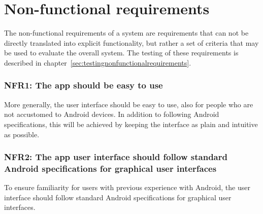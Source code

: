 \section{Non-functional requirements}
\label{sec:nonFunctionalReq}
The non-functional requirements of a system are requirements that can not be directly translated into explicit functionality, but rather a set of criteria that may be used to evaluate the overall system. The testing of these requirements is described in chapter~\ref{sec:testingnonfunctionalrequirements}.

\subsubsection{NFR1: The app should be easy to use}
More generally, the user interface should be easy to use, also for people who are not accustomed to Android devices. In addition to following Android specifications, this will be achieved by keeping the interface as plain and intuitive as possible. 

\subsubsection{NFR2: The app user interface should follow standard Android specifications for graphical user interfaces}
To ensure familiarity for users with previous experience with Android, the user interface should follow standard Android specifications for graphical user interfaces.
 
\begin{comment}

\subsubsection{NFR2: Installation guide and documentation}
The system should come with a comprehensive guide to using the system. This should include documentation for operation of the
app along with a guide to what the rest of the system operates. As the team will not be developing hardware for metering and 
aggregating data from homes, the main focus will be on the app and the team's central server. The documentation will contain an outline 
of the intended architecture for the rest of the system.


\begin{itemize}
\item The user interface should follow standard Android specifications. 
\item The applification should not need a lot of extra material to get started (Power devices, own server).
\end{itemize}

\end{comment}
